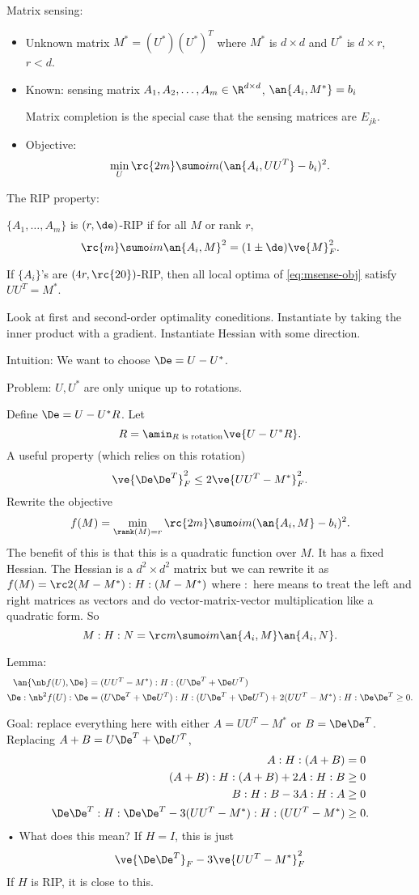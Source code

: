Matrix sensing: 
\begin{itemize}
\item
Unknown matrix $M^* = (U^*)(U^*)^T$ where $M^*$ is $d\times d$ and $U^*$ is $d\times r$, $r<d$.
\item
Known: sensing matrix $A_1,A_2,\ldots, A_m\in \R^{d\times d}$, $\an{A_i, M^*}=b_i$

Matrix completion is the special case that the sensing matrices are $E_{jk}$.
\item
Objective: 
\begin{equation}\label{eq:msense-obj}
\min_U \rc{2m} \sumo im (\an{A_i, UU^T}-b_i)^2.
\end{equation}
\end{itemize}
The RIP property:
\begin{df}
$\{A_1,\ldots, A_m\}$ is $(r,\de)$-RIP if for all $M$ or rank $r$, 
$$
\rc{m}\sumo im \an{A_i,M}^2 = (1\pm \de) \ve{M}_F^2.
$$
\end{df}
\begin{thm}[Srebro et al]
If $\{A_i\}$'s are $(4r, \rc{20})$-RIP, then all local optima of \eqref{eq:msense-obj}
satisfy $UU^T = M^*$.
\end{thm}

Look at first and second-order optimality coneditions. Instantiate by taking the inner product with a gradient. Instantiate Hessian with some direction.

Intuition: We want to choose $\De=U-U^*$. 

Problem: $U,U^*$ are only unique up to rotations. 

Define  $\De = U-U^*R$. Let 
$$
R=\amin_{R\text{ is rotation}} \ve{U-U^*R}.
$$
A useful property (which relies on this rotation)
$$
\ve{\De\De^T}_F^2\le 2\ve{UU^T - M^*}_F^2.
$$
Rewrite the objective
$$
f(M) = \min_{\rank(M)=r} \rc{2m}\sumo im (\an{A_i,M}-b_i)^2.
$$
The benefit of this is that this is a quadratic function over $M$. It has a fixed Hessian. The Hessian is a $d^2\times d^2$ matrix but we can rewrite it as $f(M) = \rc 2 (M-M^*):H:(M-M^*)$ where $:$ here means to treat the left and right matrices as vectors and do vector-matrix-vector multiplication like a quadratic form.
So 
$$
M:H:N = \rc m \sumo im \an{A_i,M}\an{A_i,N}.
$$

Lemma: 
\begin{align}
\an{\nb f(U), \De}& = (UU^T - M^*) :H:(U\De^T + \De U^T)\\
\De : \nb^2 f(U) : \De &= (U\De^T + \De U^T) : H : (U\De^T + \De U^T) + 2(UU^T - M^*) : H : \De \De^T\ge 0.
\end{align}

Goal: replace everything here with either $A=UU^T-M^*$ or $B=\De\De^T$. Replacing $A+B = U\De^T + \De U^T$, 
\begin{align}
A:H:(A+B) &= 0\\
(A+B):H:(A+B) + 2A:H:B&\ge 0\\
B:H:B-3A:H:A&\ge 0\\
\De\De^T:H:\De\De^T - 3(UU^T - M^*) : H : (UU^T - M^*) &\ge 0.
\end{align}•
What does this mean? If $H=I$, this is just 
$$
\ve{\De\De^T}_F - 3\ve{UU^T-M^*}_F^2
$$
If $H$ is RIP, it is close to this. %
